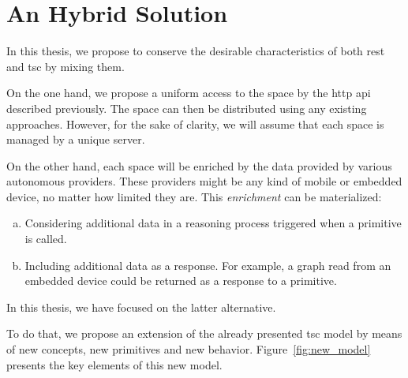 \section{An Hybrid Solution} %
\label{sec:hybrid_solution}

In this thesis, we propose to conserve the desirable characteristics of both \ac{rest} and \ac{tsc} by mixing them.

On the one hand, we propose a uniform access to the space by the \acs{http} \ac{api} described previously.
The space can then be distributed using any existing approaches. %
However, for the sake of clarity, we will assume that each space is managed by a unique server.

On the other hand, each space will be enriched by the data provided by various autonomous providers.
These providers might be any kind of mobile or embedded device, no matter how limited they are.
This \emph{enrichment} can be materialized:
\begin{enumerate}[(a)]
  \item Considering additional data in a reasoning process triggered when a primitive is called.
  \item Including additional data as a response.
        For example, a graph read from an embedded device could be returned as a response to a primitive.
\end{enumerate}
In this thesis, we have focused on the latter alternative.


To do that, we propose an extension of the already presented \ac{tsc} model by means of new concepts, new primitives and new behavior.
Figure~\ref{fig:new_model} presents the key elements of this new model.


